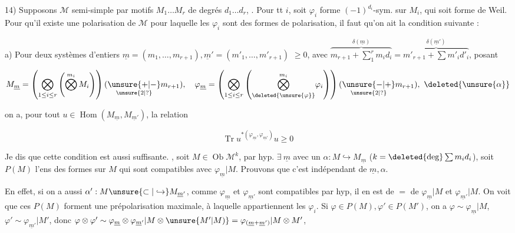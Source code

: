 
14) Supposons $\mathcal M$ semi-simple   par motifs $M_1\ldots M_r$ de degrés $d_1\ldots d_r$,   . Pour tt $i$, soit $\varphi_i$ forme $(-1)^{d_i}$-sym. sur $M_i$, qui soit  forme de Weil.  Pour qu'il existe une polarisation de $\mathcal M$  pour laquelle les $\varphi_i$ sont des formes de polarisation, il  faut qu'on ait la condition suivante :

a) Pour deux systèmes d'entiers $\underline m=(m_1,\ldots,m_{r+1}),\underline m'=(m'_1,\ldots,m'_{r+1})$ $\geq0$, avec $\overbrace{m_{r+1}+\sum_1^r m_i d_i}^{\delta(\underline m)}=\overbrace{m'_{r+1}+\sum m'_i d'_i}^{\delta(\underline m')}$, posant

\[
M_{\underline m}=\left(\bigotimes_{1\leq i\leq r}\left(\bigotimes^{m_i} M_i\right)\right)(\underset{\unsure{2|?}}{\unsure{+|-}}m_{r+1}),\quad
\varphi_{\underline m}=\left(\bigotimes_{1\leq i\leq r}\left(\underset{\deleted{\unsure{\varphi}}}{\bigotimes^{m_i}}\varphi_i\right)\right)(\underset{\unsure{2|?}}{\unsure{-|+}}m_{r+1}),\ \deleted{\unsure{\alpha}}
\]

on a, pour tout $u\in\operatorname{Hom}(M_{\underline m},M_{\underline m'})$, la relation

\[
\operatorname{Tr}u^{*(\varphi_{\underline m},\varphi_{\underline m'})}u\geq0
\]

Je dis que cette condition est aussi suffisante.   , soit $M\in\operatorname{Ob}\mathcal M^k$,  par hyp. $\exists\ \underline m$ avec un $\alpha:M\hookrightarrow M_{\underline m}$ ($k=\deleted{\text{deg}}\sum m_i d_i$), soit $P(M)$ l'ens des formes  sur $M$ qui sont compatibles avec $\varphi_{\underline m}|M$. Prouvons que c'est indépendant de $\underline m,\alpha$.

En effet, si on a aussi $\alpha':M\unsure{\subset|\hookrightarrow}M_{\underline m'}$, comme $\varphi_{\underline m}$ et $\varphi_{\underline m'}$ sont compatibles par hyp, il en est de $=$ de $\varphi_{\underline m}|M$ et $\varphi_{\underline m'}|M$. On voit que ces $P(M)$ forment une prépolarisation maximale,  à laquelle appartiennent  les $\varphi_i$. Si $\varphi\in P(M),\varphi'\in P(M')$,  on a $\varphi\sim\varphi_{\underline m}|M$, $\varphi'\sim\varphi_{\underline m'}|M'$, donc $\varphi\otimes\varphi'\sim\varphi_{\underline m}\otimes\varphi_{\underline m'}|M\otimes\unsure{M'|M)}=\varphi_{(\underline m+\underline m')}|M\otimes M'$, 

